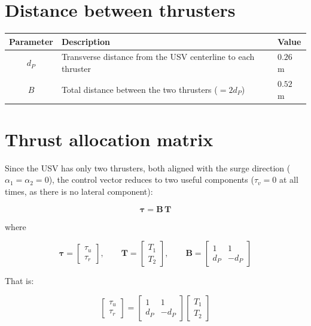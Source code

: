 \documentclass[11pt]{article}
\begin{document}
\section*{Distance between thrusters}

\begin{table}[h]
\centering
\begin{tabular}{cll}
\toprule
Parameter & Description & Value \\
\midrule
$d_P$ & Transverse distance from the USV centerline to each thruster & $0.26$ m \\
$B$ & Total distance between the two thrusters ($=2d_P$) & $0.52$ m \\
\bottomrule
\end{tabular}
\end{table}

\section*{Thrust allocation matrix}

Since the USV has only two thrusters, both aligned with the surge direction ($\alpha_1=\alpha_2=0$), the control vector reduces to two useful components ($\tau_v=0$ at all times, as there is no lateral component):

\begin{equation}
  \boldsymbol{\tau} = \mathbf{B}\,\mathbf{T}
\end{equation}

where

\begin{equation}
  \boldsymbol{\tau} = \begin{bmatrix}\tau_u\\ \tau_r\end{bmatrix}, \qquad
  \mathbf{T} = \begin{bmatrix}T_1\\ T_2\end{bmatrix}, \qquad
  \mathbf{B} = \begin{bmatrix}1 & 1\\ d_P & -d_P\end{bmatrix}
\end{equation}

That is:

\begin{equation}
  \begin{bmatrix}\tau_u\\ \tau_r\end{bmatrix}
  =
  \begin{bmatrix}1 & 1\\ d_P & -d_P\end{bmatrix}
  \begin{bmatrix}T_1\\ T_2\end{bmatrix}
\end{equation}
\end{document}
